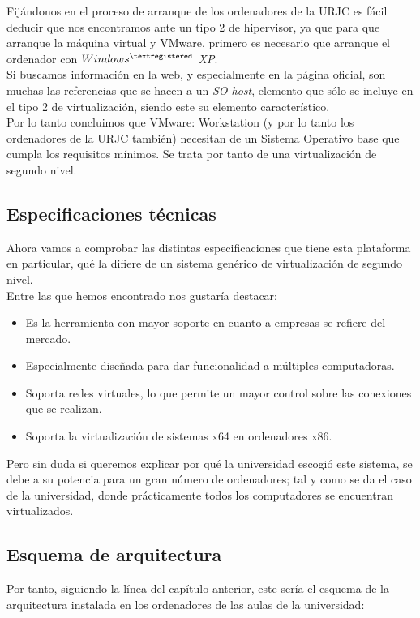 Fijándonos en el proceso de arranque de los ordenadores de la URJC es fácil deducir que nos encontramos ante un tipo 2 de hipervisor, ya que para que arranque la máquina virtual y VMware, primero es necesario que arranque el ordenador con \emph{$Windows^{\textregistered}$ XP}.\\

Si buscamos información en la web\cite{refvmware1}, y especialmente en la página oficial\cite{vmwareworkguiaso}\cite{refvmware2}, son muchas las referencias que se hacen a un \emph{SO host}, elemento que sólo se incluye en el tipo 2 de virtualización, siendo este su elemento característico.\\

Por lo tanto concluimos que VMware: Workstation (y por lo tanto los ordenadores de la URJC también) necesitan de un Sistema Operativo base que cumpla los requisitos mínimos. Se trata por tanto de una virtualización de segundo nivel.

\subsection{Especificaciones técnicas}
Ahora vamos a comprobar las distintas especificaciones que tiene esta plataforma en particular, qué la difiere de un sistema genérico de virtualización de segundo nivel.\\

Entre las que hemos encontrado nos gustaría destacar:

\begin{itemize}
\item Es la herramienta con mayor soporte en cuanto a empresas se refiere del mercado.
\item Especialmente diseñada para dar funcionalidad a múltiples computadoras.
\item Soporta redes virtuales, lo que permite un mayor control sobre las conexiones que se realizan.
\item Soporta la virtualización de sistemas x64 en ordenadores x86.
\end{itemize}

Pero sin duda si queremos explicar por qué la universidad escogió este sistema, se debe a su potencia para un gran número de ordenadores; tal y como se da el caso de la universidad, donde prácticamente todos los computadores se encuentran virtualizados.

\subsection{Esquema de arquitectura}
Por tanto, siguiendo la línea del capítulo anterior, este sería el esquema de la arquitectura instalada en los ordenadores de las aulas de la universidad:

